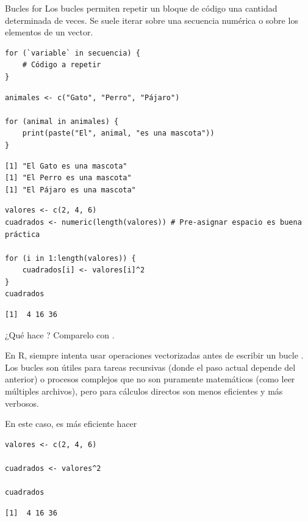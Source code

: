 \documentclass[8pt]{beamer}
\begin{document}
\begin{frame}[fragile]{Bucles for}
Los bucles  permiten repetir un bloque de código una cantidad determinada de veces. Se suele iterar sobre una secuencia numérica o sobre los elementos de un vector.

\begin{lstlisting}[style=RScript]
for (`variable` in secuencia) {
	# Código a repetir
}	
\end{lstlisting}

\begin{lstlisting}[style=RScript]
animales <- c("Gato", "Perro", "Pájaro")

for (animal in animales) {
	print(paste("El", animal, "es una mascota"))
}	
\end{lstlisting}
\begin{lstlisting}[style=RConsole]
[1] "El Gato es una mascota"
[1] "El Perro es una mascota"
[1] "El Pájaro es una mascota"
\end{lstlisting}
\end{frame}





\begin{frame}[fragile]
\begin{lstlisting}[style=RScript]
valores <- c(2, 4, 6)
cuadrados <- numeric(length(valores)) # Pre-asignar espacio es buena práctica

for (i in 1:length(valores)) {
	cuadrados[i] <- valores[i]^2
}
cuadrados
\end{lstlisting}
\begin{lstlisting}[style=RConsole]
	[1]  4 16 36
\end{lstlisting}

\begin{block}{}
	¿Qué hace ? Comparelo con .
\end{block}
\end{frame}



\begin{frame}[fragile]
	En R, siempre intenta usar operaciones vectorizadas antes de escribir un bucle . Los bucles son útiles para tareas recursivas (donde el paso actual depende del anterior) o procesos complejos que no son puramente matemáticos (como leer múltiples archivos), pero para cálculos directos son menos eficientes y más verbosos.
	
	En este caso, es más eficiente hacer
\begin{lstlisting}[style=RScript]
valores <- c(2, 4, 6)

cuadrados <- valores^2

cuadrados
\end{lstlisting}
\begin{lstlisting}[style=RConsole]
[1]  4 16 36
\end{lstlisting}
\end{frame}
\end{document}
